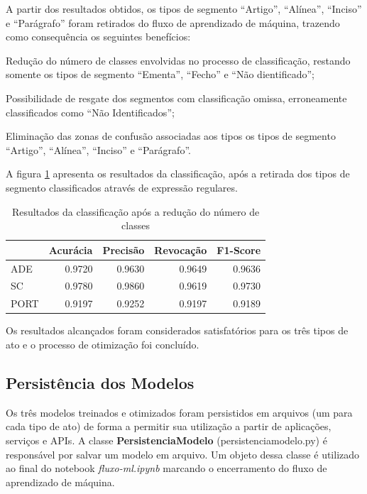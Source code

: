 A partir dos resultados obtidos, os tipos de segmento ``Artigo'', ``Alínea'', ``Inciso'' e ``Parágrafo'' foram retirados do fluxo de aprendizado de máquina, trazendo como consequência os seguintes benefícios:
\begin{alineas}
	\item Redução do número de classes envolvidas no processo de classificação, restando somente os tipos de segmento ``Ementa'', ``Fecho'' e ``Não dientificado'';
	\item Possibilidade de resgate dos segmentos com classificação omissa, erroneamente classificados como ``Não Identificados'';
	\item Eliminação das zonas de confusão associadas aos tipos os tipos de segmento ``Artigo'', ``Alínea'', ``Inciso'' e ``Parágrafo''.
\end{alineas}  

A figura \ref{tab:resultados-apos-classificacao-regex} apresenta os resultados da classificação, após a retirada dos tipos de segmento classificados através de expressão regulares. 

\begin{table}[h]
\caption{Resultados da classificação após a redução do número de  classes}
\label{tab:resultados-apos-classificacao-regex}
	\begin{center}
	\begin{tabular}{lrrrr}
		\toprule
		{} &  Acurácia &  Precisão &  Revocação &      F1-Score \\
		\midrule
		ADE     &    0.9720 &    0.9630 &     0.9649 &  0.9636 \\
		SC      &    0.9780 &    0.9860 &     0.9619 &  0.9730 \\					PORT 	&    0.9197 &    0.9252 &     0.9197 &  0.9189 \\
		\bottomrule
	\end{tabular}
	\end{center}		
\end{table}

Os resultados alcançados foram considerados satisfatórios para os três tipos de ato e o processo de otimização foi concluído.

\subsection{Persistência dos Modelos}

Os três modelos treinados e otimizados foram persistidos em arquivos (um para cada tipo de ato) de forma a permitir sua utilização a partir de aplicações, serviços e APIs. A classe \textbf{PersistenciaModelo} (persistencia\textunderscore modelo.py) é responsável por salvar um modelo em arquivo. Um objeto dessa classe é utilizado ao final do notebook \textit{fluxo-ml.ipynb} marcando o encerramento do fluxo de aprendizado de máquina. 

